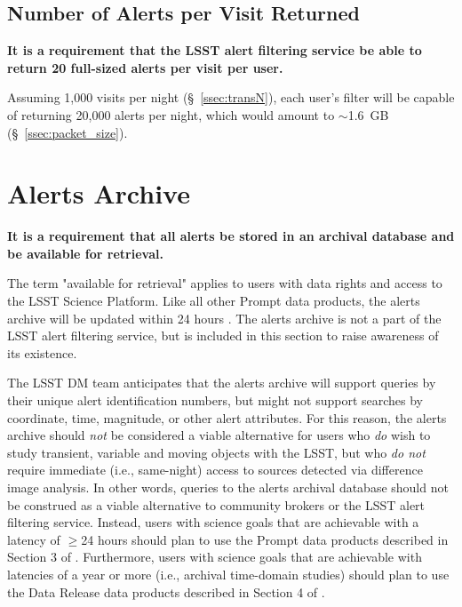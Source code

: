 \documentclass[DM,authoryear,toc]{lsstdoc}
\begin{document}
\subsection{Number of Alerts per \gls{Visit} Returned}\label{ssec:LAFS_returns}

{\bf It is a requirement that the \gls{LSST} alert filtering service be able to return 20 full-sized alerts per visit per user.}

Assuming 1,000 visits per night (\S~\ref{ssec:transN}), each user's filter will be capable of returning 20,000 alerts per night, which would amount to $\sim$1.6~GB (\S~\ref{ssec:packet_size}).


\section{Alerts \gls{Archive}}\label{ssec:LAFS_adb}

{\bf It is a requirement that all alerts be stored in an archival database and be available for retrieval.}

The term "available for retrieval" applies to users with data rights and access to the \gls{LSST} \gls{Science Platform}. Like all other Prompt data products, the alerts archive will be updated within 24 hours . The alerts archive is not a part of the \gls{LSST} alert filtering service, but is included in this section to raise awareness of its existence. 

The \gls{LSST} \gls{DM} team anticipates that the alerts archive will support queries by their unique alert identification numbers, but might not support searches by coordinate, time, magnitude, or other alert attributes. For this reason, the alerts archive should {\em not} be considered a viable alternative for users who {\em do} wish to study \gls{transient}, variable and moving objects with the \gls{LSST}, but who {\em do not} require immediate (i.e., same-night) access to sources detected via difference image analysis. In other words, queries to the alerts archival database should not be construed as a viable alternative to community brokers or the \gls{LSST} alert filtering service. Instead, users with science goals that are achievable with a latency of $\geq$24 hours should plan to use the Prompt data products described in Section 3 of . Furthermore, users with science goals that are achievable with latencies of a year or more (i.e., archival time-domain studies) should plan to use the Data \gls{Release} data products described in Section 4 of .


\appendix
\label{sec:bib}


\label{sec:acronyms}
\printglossaries
\end{document}
